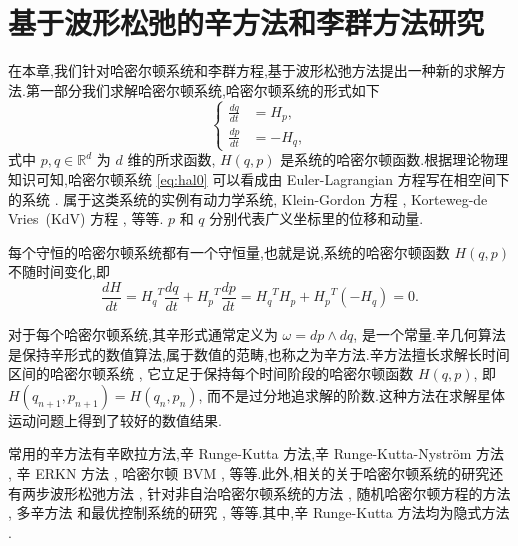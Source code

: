 \chapter{基于波形松弛的辛方法和李群方法研究}

在本章,我们针对哈密尔顿系统和李群方程,基于波形松弛方法提出一种新的求解方法.第一部分我们求解哈密尔顿系统,哈密尔顿系统的形式如下
\begin{equation}\label{eq:hal0}
  \left\lbrace
    \begin{aligned}
      \frac{dq}{dt}&=H_p,\\
      \frac{dp}{dt}&=-H_q,
    \end{aligned}
  \right.
\end{equation}
式中 $p,q \in \mathbb{R}^d$ 为 $d$ 维的所求函数, $H(q,p)$ 是系统的哈密尔顿函数.根据理论物理知识可知,哈密尔顿系统 \eqref{eq:hal0} 可以看成由 Euler-Lagrangian 方程写在相空间下的系统 \cite{frankel2011geometry}. 属于这类系统的实例有动力学系统, Klein-Gordon 方程 \cite{nakanishi2011global}, Korteweg-de Vries~(KdV) 方程 \cite{abdalla2012three}, 等等. $p$ 和 $q$ 分别代表广义坐标里的位移和动量.

每个守恒的哈密尔顿系统都有一个守恒量,也就是说,系统的哈密尔顿函数 $H(q,p)$ 不随时间变化,即
\begin{equation*}
  \frac{dH}{dt}={H_q}^T\frac{dq}{dt}+{H_p}^T\frac{dp}{dt}={H_q}^TH_p+{H_p}^T(-H_q)=0.
\end{equation*}

对于每个哈密尔顿系统,其辛形式通常定义为 $\omega = dp \wedge dq$, 是一个常量.辛几何算法是保持辛形式的数值算法,属于数值的范畴,也称之为辛方法.辛方法擅长求解长时间区间的哈密尔顿系统 \cite{feng2010symplectic,hairer2006geometric}, 它立足于保持每个时间阶段的哈密尔顿函数  $H(q,p)$, 即 $H(q_{n+1},p_{n+1})=H(q_n,p_n)$, 而不是过分地追求解的阶数.这种方法在求解星体运动问题上得到了较好的数值结果.

常用的辛方法有辛欧拉方法,辛 Runge-Kutta 方法,辛 Runge-Kutta-Nystr{\"o}m 方法 \cite{kalogiratou2014fourth,kalogiratou2015}, 辛 ERKN 方法 \cite{wang2014ahigh}, 哈密尔顿 BVM \cite{brugnano2014multi}, 等等.此外,相关的关于哈密尔顿系统的研究还有两步波形松弛方法 \cite{hassanzadeh2014two}, 针对非自治哈密尔顿系统的方法 \cite{hong2000numerical,zhang2010anote}, 随机哈密尔顿方程的方法 \cite{burrage2014structure,ma2015sto,fan2015using}, 多辛方法 \cite{wang2013multi} 和最优控制系统的研究 \cite{li2015asym}, 等等.其中,辛 Runge-Kutta 方法均为隐式方法 \cite{sanz1988runge}.

